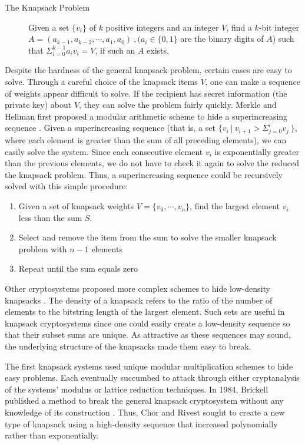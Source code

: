 \documentclass[12pt,a4paper,titlepage]{article}
\begin{document}
\begin{description}
\item [The Knapsack Problem] Given a set $\{v_i\}$ of $k$ positive integers and an integer $V$, find a $k$-bit integer $A=(a_{k-1},a_{k-2}, \cdots,a_1,a_0)\ , ( a_i \in \{0,1\}$ are the binary digits of $A$) such that $\Sigma_{i = 0}^{k-1} a_i v_i = V$, if such an $A$ exists. \cite{numcry:7}
\end{description}



Despite the hardness of the general knapsack problem, certain cases are easy to solve. Through a careful choice of the knapsack items $V$, one can make a sequence of weights appear difficult to solve. If the recipient has secret information (the private key) about $V$, they can solve the problem fairly quickly. Merkle and Hellman first proposed a modular arithmetic scheme to hide a superincreasing sequence \cite{Merkle:10}. Given a superincreasing sequence (that is, a set $\{ v_i \ | \ v_{i+1} > \Sigma_{j=0}^{i} v_j \ \}$, where each element is greater than the sum of all preceding elements), we can easily solve the system. Since each consecutive element $v_i$ is exponentially greater than the previous elements, we do not have to check it again to solve the reduced the knapsack problem. Thus, a superincreasing sequence could be recursively solved with this simple procedure: 
\begin{enumerate}
\item Given a set of knapsack weights $V = \{v_0 , \cdots , v_n \}$, find the largest element $v_i$ less than the sum $S$.
\item Select and remove the item from the sum to solve the smaller knapsack problem with $n-1$ elements
\item Repeat until the sum equals zero
\end{enumerate}
\par Other cryptosystems proposed more complex schemes to hide low-density knapsacks \cite{analysis:3}.  The density of a knapsack refers to the ratio of the number of elements to the bitstring length of the largest element. Such sets are useful in knapsack cryptosystems since one could easily create a low-density sequence so that their subset sums are unique. As attractive as these sequences may sound, the underlying structure of the knapsacks made them easy to break.
\\
\par The first knapsack systems used unique modular multiplication schemes to hide easy problems. Each eventually succumbed to attack through either cryptanalysis of the systems' modulus or lattice reduction techniques. In 1984, Brickell published a method to break the general knapsack cryptosystem without any knowledge of its construction \cite{analysis:3}. Thus, Chor and Rivest sought to create a new type of knapsack using a high-density sequence that increased polynomially rather than exponentially.
\end{document}
